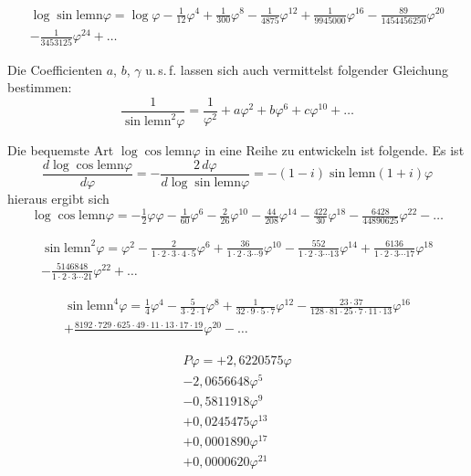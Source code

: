 \documentclass[10pt,a4paper]{article}
\newcommand{\lemn}{\text{lemn}}
\newcommand{\sinlemn}{\sin\lemn}
\newcommand{\coslemn}{\cos\lemn}
\begin{document}
\begin{multline*}
\log\sinlemn\varphi = \log\varphi - \tfrac{1}{12}\varphi^4 + \tfrac{1}{300}\varphi^8 - \tfrac{1}{4875}\varphi^{12} + \tfrac{1}{9945000}\varphi^{16} - \tfrac{89}{1454456250}\varphi^{20}\\
- \tfrac{1}{3453125}\varphi^{24} + \ldots
\end{multline*}

Die Coefficienten $a$, $b$, $\gamma$ u.\,s.\,f. lassen sich auch vermittelst folgender Gleichung bestimmen:
\[
\frac{1}{\sinlemn^2\varphi} = \frac{1}{\varphi^2} + a\varphi^2 + b\varphi^6 + c\varphi^{10} + \ldots
\]

Die bequemste Art $\log\coslemn\varphi$ in eine Reihe zu entwickeln ist folgende. Es ist
\[
\frac{d\log\coslemn\varphi}{d\varphi} = -\frac{2\,d\varphi}{d\log\sinlemn\varphi} = -(1-i)\sinlemn(1+i)\varphi
\]
hieraus ergibt sich
\[
\log\coslemn\varphi = -\tfrac{1}{2}\varphi\varphi - \tfrac{1}{60}\varphi^6 - \tfrac{2}{26}\varphi^{10} - \tfrac{44}{208}\varphi^{14} - \tfrac{422}{30}\varphi^{18} - \tfrac{6428}{44890625}\varphi^{22} - \ldots
\]

\begin{multline*}
\sinlemn^2\varphi = \varphi^2 - \tfrac{2}{1\cdot2\cdot3\cdot4\cdot5}\varphi^6 + \tfrac{36}{1\cdot2\cdot3\cdots9}\varphi^{10} - \tfrac{552}{1\cdot2\cdot3\cdots13}\varphi^{14} + \tfrac{6136}{1\cdot2\cdot3\cdots17}\varphi^{18}\\
- \tfrac{5146848}{1\cdot2\cdot3\cdots21}\varphi^{22} + \ldots
\end{multline*}

\begin{multline*}
\sinlemn^4\varphi = \tfrac{1}{4}\varphi^4 - \tfrac{5}{3\cdot2\cdot1}\varphi^8 + \tfrac{1}{32\cdot9\cdot5\cdot7}\varphi^{12} - \tfrac{23\cdot37}{128\cdot81\cdot25\cdot7\cdot11\cdot13}\varphi^{16}\\
+ \tfrac{8192\cdot729\cdot625\cdot49\cdot11\cdot13\cdot17\cdot19}{}\varphi^{20} - \ldots
\end{multline*}

\begin{multline*}
P\varphi = +2{,}6220575\varphi\\
- 2{,}0656648\varphi^5\\
- 0{,}5811918\varphi^9\\
+ 0{,}0245475\varphi^{13}\\
+ 0{,}0001890\varphi^{17}\\
+ 0{,}0000620\varphi^{21}
\end{multline*}
\end{document}
